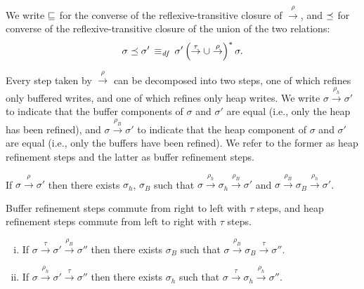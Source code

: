 \documentclass[11pt]{article}
\begin{document}
We write $\sqsubseteq$ for the converse of the reflexive-transitive closure of $\stackrel{\rho}{\rightarrow}$, and $\preceq$ for converse of the reflexive-transitive closure of the union of the two relations: \[ \sigma \preceq \sigma' \operatorname{\;\equiv_{\mathit{df}}\;} \sigma' \left( \stackrel{\tau}{\rightarrow} \cup \stackrel{\rho}{\rightarrow} \right)^{\ast} \sigma.\] 

Every step taken by $\stackrel{\rho}{\rightarrow}$ can be decomposed into two steps, one of which refines only buffered writes, and one of which refines only heap writes. We write $\sigma \stackrel{\rho_h}{\rightarrow} \sigma'$ to indicate that the buffer components of $\sigma$ and $\sigma'$ are equal (i.e., only the heap has been refined), and $\sigma \stackrel{\rho_B}{\rightarrow} \sigma'$ to indicate that the heap component of $\sigma$ and $\sigma'$ are equal (i.e., only the buffers have been refined). We refer to the former as heap refinement steps and the latter as buffer refinement steps. 

\begin{lemma}
	\label{lem:rho-decompose}
	If $\sigma \stackrel{\rho}{\rightarrow} \sigma'$ then there exists $\sigma_h$, $\sigma_B$ such that $\sigma \stackrel{\rho_h}{\rightarrow} \sigma_h \stackrel{\rho_B}{\rightarrow} \sigma'$ and $\sigma \stackrel{\rho_B}{\rightarrow} \sigma_B \stackrel{\rho_h}{\rightarrow} \sigma'$. 
\end{lemma}

Buffer refinement steps commute from right to left with $\tau$ steps, and heap refinement steps commute from left to right with $\tau$ steps. 

\begin{lemma}
	\label{lem:tau-rho-semi-commute} \hspace{1em}
	\begin{enumerate}[(i)]
		\item If $\sigma \stackrel{\tau}{\rightarrow} \sigma' \stackrel{\rho_B}{\rightarrow} \sigma''$ then there exists $\sigma_B$ such that $\sigma \stackrel{\rho_B}{\rightarrow} \sigma_B \stackrel{\tau}{\rightarrow} \sigma''$. 
		\item If $\sigma \stackrel{\rho_h}{\rightarrow} \sigma' \stackrel{\tau}{\rightarrow} \sigma''$ then there exists $\sigma_h$ such that $\sigma \stackrel{\tau}{\rightarrow} \sigma_h \stackrel{\rho_h}{\rightarrow} \sigma''$. 
	\end{enumerate}
	
\end{lemma}
\end{document}
